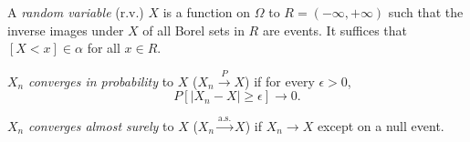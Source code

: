 A \textit{random variable} (r.v.) $X$ is a function on $\Omega$ to $R = (-\infty, +\infty)$ such that the inverse images under $X$ of all Borel sets in $R$ are events. It suffices that $[X < x] \in \alpha$ for all $x \in R$.

$X_n$ \textit{converges in probability} to $X$ ($X_n \xrightarrow{P} X$) if for every $\epsilon > 0$,
$$P[|X_n - X| \geq \epsilon] \to 0.$$

$X_n$ \textit{converges almost surely} to $X$ ($X_n \xrightarrow{\text{a.s.}} X$) if $X_n \to X$ except on a null event.
